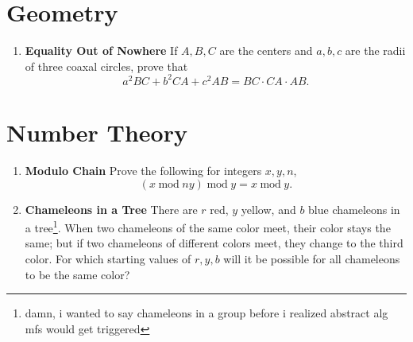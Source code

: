 \documentclass[11pt]{scrartcl}
\begin{document}
\newpage
\section{Geometry}
\begin{enumerate}[label=\textbf{G\arabic*}.]
    \item \textbf{Equality Out of Nowhere} \newline
    If $A, B, C$ are the centers and $a, b, c$ are the radii of three coaxal circles, prove that
    \[ a^2BC + b^2CA + c^2AB = BC \cdot CA \cdot AB. \]

    

    
\end{enumerate}

\newpage
\section{Number Theory}
\begin{enumerate}[label=\textbf{N\arabic*}.]
    \item \textbf{Modulo Chain} \newline
    Prove the following for integers $x, y, n$,
    \[ (x \hspace{3pt}\mathrm{mod}\hspace{3pt} ny) \hspace{3pt}\mathrm{mod}\hspace{3pt} y = x \hspace{3pt}\mathrm{mod}\hspace{3pt} y. \]

    \item \textbf{Chameleons in a Tree} \newline
    There are $r$ red, $y$ yellow, and $b$ blue chameleons in a tree\footnote{damn, i wanted to say chameleons in a group before i realized abstract alg mfs would get triggered}. When two chameleons of the same color meet, their color stays the same; but if two chameleons of different colors meet, they change to the third color. For which starting values of $r, y, b$ will it be possible for all chameleons to be the same color?
    
\end{enumerate}
\end{document}
